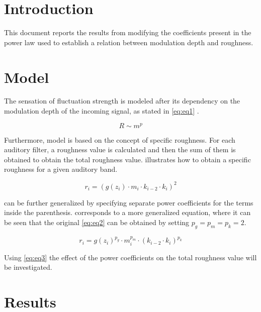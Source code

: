 \documentclass{article}
\begin{document}

\section{Introduction}

This document reports the results from modifying the coefficients present in the
power law used to establish a relation between modulation depth and roughness.

\section{Model}

The sensation of fluctuation strength is modeled after its dependency on the
modulation depth of the incoming signal, as stated in \cref{eq:eq1}
\cite[p.~115]{daniel1997psychoacoustical}.

\begin{equation}
  \label{eq:eq1}
  R \sim m ^ p
\end{equation}

Furthermore, \citeauthor{daniel1997psychoacoustical} model is based on the
concept of specific roughness. For each auditory filter, a roughness value is
calculated and then the sum of them is obtained to obtain the total roughness
value.  illustrates how to obtain a specific roughness for a given
auditory band.

\begin{equation}
  \label{eq:eq2}
  r_i = (g(z_i) \cdot m_i \cdot k_{i-2} \cdot k_i)^2
\end{equation}

 can be further generalized by specifying separate power
coefficients for the terms inside the parenthesis.  corresponds to
a more generalized equation, where it can be seen that the original
\cref{eq:eq2} can be obtained by setting $p_g = p_m = p_k = 2$.

\begin{equation}
  \label{eq:eq3}
  r_i = g(z_i)^{p_g} \cdot m_{i}^{p_m} \cdot (k_{i-2} \cdot k_i)^{p_k}
\end{equation}

Using \cref{eq:eq3} the effect of the power coefficients on the total roughness
value will be investigated.

\section{Results}
\end{document}
